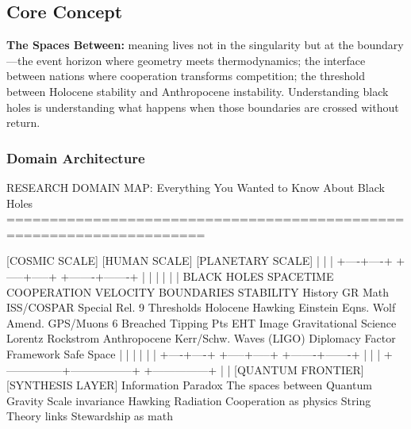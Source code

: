 \documentclass[11pt,letterpaper]{article}
\begin{document}
\subsection{Core Concept}

\begin{quotebox}
\textbf{The Spaces Between:} meaning lives not in the singularity but at the boundary---the event horizon where geometry meets thermodynamics; the interface between nations where cooperation transforms competition; the threshold between Holocene stability and Anthropocene instability. Understanding black holes is understanding what happens when those boundaries are crossed without return.
\end{quotebox}

\subsubsection{Domain Architecture}

\begin{asciibox}
RESEARCH DOMAIN MAP: Everything You Wanted to Know About Black Holes
=====================================================================

  [COSMIC SCALE]                    [HUMAN SCALE]               [PLANETARY SCALE]
       |                                 |                              |
  +----+----+                      +-----+-----+               +-------+-------+
  |         |                      |           |               |               |
BLACK HOLES  SPACETIME          COOPERATION  VELOCITY       BOUNDARIES    STABILITY
 History     GR Math            ISS/COSPAR   Special Rel.   9 Thresholds  Holocene
 Hawking     Einstein Eqns.     Wolf Amend.  GPS/Muons      6 Breached    Tipping Pts
 EHT Image   Gravitational      Science      Lorentz        Rockstrom     Anthropocene
 Kerr/Schw.  Waves (LIGO)       Diplomacy    Factor         Framework     Safe Space
  |         |                      |           |               |               |
  +----+----+                      +-----+-----+               +-------+-------+
       |                                 |                              |
       +---------------+-----------------+              +---------------+
                       |                                |
              [QUANTUM FRONTIER]              [SYNTHESIS LAYER]
              Information Paradox             The spaces between
              Quantum Gravity                 Scale invariance
              Hawking Radiation               Cooperation as physics
              String Theory links             Stewardship as math
\end{asciibox}
\end{document}
